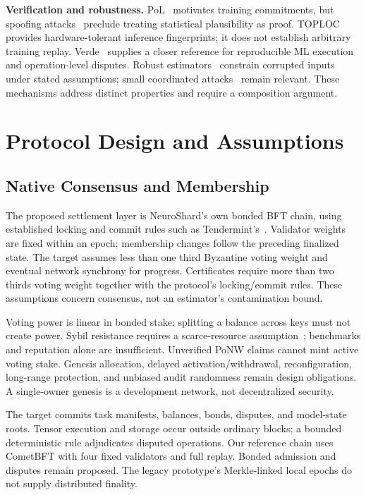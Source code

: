 \documentclass[conference]{IEEEtran}
\begin{document}
\textbf{Verification and robustness.} PoL~\cite{jia2021proof} motivates training commitments, but spoofing attacks~\cite{zhang2022adversarial,fang2023proof} preclude treating statistical plausibility as proof. TOPLOC~\cite{ong2025toploc} provides hardware-tolerant inference fingerprints; it does not establish arbitrary training replay. Verde~\cite{arun2025verde} supplies a closer reference for reproducible ML execution and operation-level disputes. Robust estimators~\cite{yin2018byzantine,blanchard2017machine} constrain corrupted inputs under stated assumptions; small coordinated attacks~\cite{baruch2019little} remain relevant. These mechanisms address distinct properties and require a composition argument.

\section{Protocol Design and Assumptions}
\label{sec:design}

\subsection{Native Consensus and Membership}

The proposed settlement layer is NeuroShard's own bonded BFT chain, using established locking and commit rules such as Tendermint's~\cite{buchman2019tendermint}. Validator weights are fixed within an epoch; membership changes follow the preceding finalized state. The target assumes less than one third Byzantine voting weight and eventual network synchrony for progress. Certificates require more than two thirds voting weight together with the protocol's locking/commit rules. These assumptions concern consensus, not an estimator's contamination bound.

Voting power is linear in bonded stake: splitting a balance across keys must not create power. Sybil resistance requires a scarce-resource assumption~\cite{douceur2002sybil}; benchmarks and reputation alone are insufficient. Unverified PoNW claims cannot mint active voting stake. Genesis allocation, delayed activation/withdrawal, reconfiguration, long-range protection, and unbiased audit randomness remain design obligations. A single-owner genesis is a development network, not decentralized security.

The target commits task manifests, balances, bonds, disputes, and model-state roots. Tensor execution and storage occur outside ordinary blocks; a bounded deterministic rule adjudicates disputed operations. Our reference chain uses CometBFT with four fixed validators and full replay. Bonded admission and disputes remain proposed. The legacy prototype's Merkle-linked local epochs do not supply distributed finality.
\end{document}
